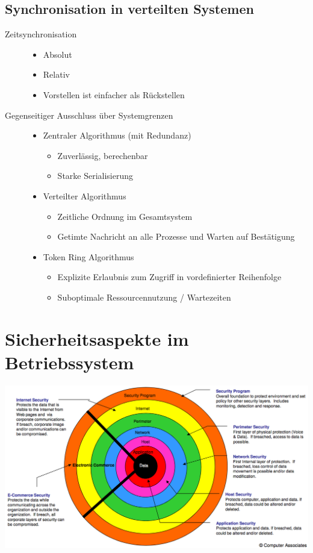 \documentclass[a4paper, 10pt]{article}
\begin{document}
\subsection{Synchronisation in verteilten Systemen}
\begin{description}
	\item[Zeitsynchronisation] \hfill
		\begin{itemize}
			\item Absolut
			\item Relativ
			\item Vorstellen ist einfacher als Rückstellen
		\end{itemize}
	\item[Gegenseitiger Ausschluss über Systemgrenzen] \hfill
		\begin{itemize}
			\item Zentraler Algorithmus (mit Redundanz)
				\begin{itemize}
					\item Zuverlässig, berechenbar
					\item Starke Serialisierung
				\end{itemize}
			\item Verteilter Algorithmus
				\begin{itemize}
					\item Zeitliche Ordnung im Gesamtsystem
					\item Getimte Nachricht an alle Prozesse und Warten auf Bestätigung 
				\end{itemize}
			\item Token Ring Algorithmus
				\begin{itemize}
					\item Explizite Erlaubnis zum Zugriff in vordefinierter Reihenfolge
					\item Suboptimale Ressourcennutzung / Wartezeiten
				\end{itemize}
		\end{itemize}
\end{description}

\newpage
\section{Sicherheitsaspekte im Betriebssystem}
\includegraphics[scale=0.35]{onion_security.png}
\end{document}
